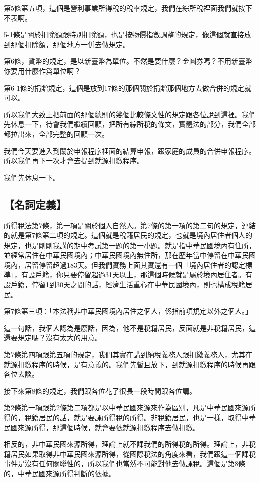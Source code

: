 \documentclass[oneside,sub3section]{ctexbook}
\begin{document}
第5條第五項，這個是營利事業所得稅的稅率規定，我們在綜所稅裡面我們就按下不表啊。

5-1條是關於扣除額跟特別扣除額，也是按物價指數調整的規定，像這個就直接放到那個扣除額，那個地方一併去做規定。

第6條，貨幣的規定，是以新臺幣為單位。不然是要什麼？金圓券嗎？不用新臺幣你要用什麼作爲單位啊？

第6-1條的捐贈規定，這個是放到17條的那個關於捐贈那個地方去做合併的規定就可以。

所以我們大致上把前面的那個總則的幾個比較條文性的規定跟各位說到這裡。我們先休息一下，待會我們繼續回顧，把所有綜所稅的條文，實體法的部分，我們全部都拉出來，全部完整的回顧一次。

我們今天要進入到關於申報程序裡面的結算申報，跟家庭的成員的合併申報程序。所以我們再下一次才會去提到就源扣繳程序。

我們先休息一下。

\hypertarget{ux540dux8a5eux5b9aux7fa9}{%
\subsection{【名詞定義】}\label{ux540dux8a5eux5b9aux7fa9}}

所得稅法第7條，第一項是關於個人自然人。第7條的第一項的第二句的規定，連結的就是第7條第二項的規定。這個就是稅籍居民的規定，也就是境內居住者個人的規定，也是剛剛我講的期中考試第一題的第一小題。就是指中華民國境內有住所，並經常居住在中華民國境內；中華民國境內無住所，那在歷年當中停留在中華民國境內，居留停留超過183天。但我們實務上面其實還有一個「境內居住者的認定標準」，有設戶籍，你只要停留超過31天以上，那這個時候就是屬於境內居住者。有設戶籍，停留1到30天之間的話，經濟生活重心在中華民國境內，則也構成稅籍居民。

第7條第三項：「本法稱非中華民國境內居住之個人，係指前項規定以外之個人。」

這一句話，我個人認為是廢話，因為，他不是稅籍居民，反面就是非稅籍居民，這還要規定嗎？沒有太大的用意。

第7條第四項跟第五項的規定，我們其實在講到納稅義務人跟扣繳義務人，尤其在就源扣繳程序的時候，是有意義的。我們先暫且放下，到就源扣繳程序的時候再跟各位去談。

接下來第8條的規定，我們跟各位花了很長一段時間跟各位講。

第2條第一項跟第2條第二項都是以中華民國來源來作為區別，凡是中華民國來源所得的，稅籍居民的話，就是要課所得稅的所得。非稅籍居民，也是一樣，取得中華民國來源所得，那這個時候，就會要依就源扣繳程序去做扣繳。

相反的，非中華民國來源所得，理論上就不課我們的所得稅的所得。理論上，非稅籍居民如果取得非中華民國來源所得，從國際稅法的角度來看，我們跟這一個課稅事件是沒有任何關聯性的，所以我們也當然不可能對他去做課稅。這個是第8條的，中華民國來源所得判斷的依據。
\end{document}
